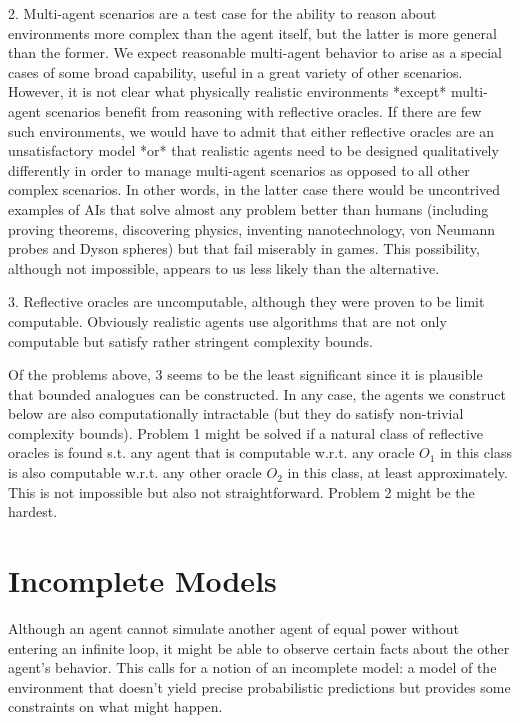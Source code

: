 \documentclass[a4paper]{article}
\begin{document}
2. Multi-agent scenarios are a test case for the ability to reason about environments more complex than the agent itself, but the latter is more general than the former. We expect reasonable multi-agent behavior to arise as a special cases of some broad capability, useful in a great variety of other scenarios. However, it is not clear what physically realistic environments *except* multi-agent scenarios benefit from reasoning with reflective oracles. If there are few such environments, we would have to admit that either reflective oracles are an unsatisfactory model *or* that realistic agents need to be designed qualitatively differently in order to manage multi-agent scenarios as opposed to all other complex scenarios. In other words, in the latter case there would be uncontrived examples of AIs that solve almost any problem better than humans (including proving theorems, discovering physics, inventing nanotechnology, von Neumann probes and Dyson spheres) but that fail miserably in games. This possibility, although not impossible, appears to us less likely than the alternative.

3. Reflective oracles are uncomputable, although they were proven to be limit computable. Obviously realistic agents use algorithms that are not only computable but satisfy rather stringent complexity bounds.

Of the problems above, 3 seems to be the least significant since it is plausible that bounded analogues can be constructed. In any case, the agents we construct below are also computationally intractable (but they do satisfy non-trivial complexity bounds). Problem 1 might be solved if a natural class of reflective oracles is found s.t. any agent that is computable w.r.t. any oracle ${O_1}$ in this class is also computable w.r.t. any other oracle ${O_2}$ in this class, at least approximately. This is not impossible but also not straightforward. Problem 2 might be the hardest.

\section{Incomplete Models}

Although an agent cannot simulate another agent of equal power without entering an infinite loop, it might be able to observe certain facts about the other agent's behavior. This calls for a notion of an incomplete model: a model of the environment that doesn't yield precise probabilistic predictions but provides some constraints on what might happen. 
\end{document}

